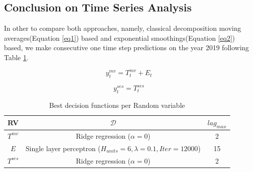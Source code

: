 \subsection{Conclusion on Time Series Analysis}

In other to compare both approaches, namely, classical decomposition moving averages(Equation \ref{eq1}) based and exponential smoothings(Equation \ref{eq2}) based, we make consecutive one time step predictions on the year 2019 following Table \ref{table:r1}.

\begin{equation}
y^{mv}_{t}=T^{mv}_{t}+E_{t}
\label{eq1}
\end{equation}

\begin{equation}
y^{ses}_{t}=T^{ses}_{t}
\label{eq2}
\end{equation}

\begin{table}[h!]
	\begin{center}
		\begin{tabular}{||c c c||} 
			\hline
			RV & $\mathcal{D}$ & $lag_{max}$ \\ [0.5ex] 
			\hline\hline
			$T^{mv}$ & Ridge regression ($\alpha =0$) & 2  \\ 
			\hline
			$E$ & Single layer perceptron ($H_{units}=6,\lambda=0.1,Iter=12000$) & 15  \\ 
			\hline
			$T^{ses}$ &  Ridge regression ($\alpha =0$) & 2  \\ 
			\hline
		\end{tabular}
		\caption{Best decision functions per Random variable}
		\label{table:r1}
	\end{center}
\end{table}





